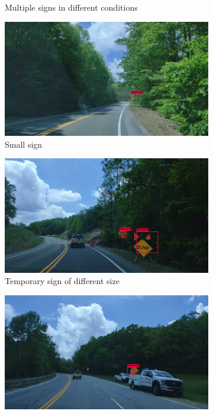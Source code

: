 \begin{figure}
\begin{center}
\begin{subfigure}[t]{.49\linewidth}
      \caption{Multiple signs in different conditions}
      \label{fig:multipleTP}
    \end{subfigure}
    \begin{subfigure}[t]{.49\linewidth}
      \centering
      \includegraphics[width=0.99\linewidth]{figures/examples/sr2/TP/TP_08.png}
      \caption{Small sign}
      \label{fig:smallTP}
    \end{subfigure}
    \begin{subfigure}[t]{.49\linewidth}
      \centering
      \includegraphics[width=0.99\linewidth]{figures/examples/sr2/TP/TP_02.png}
      \caption{Temporary sign of different size}
      \label{fig:bigtempTP}
    \end{subfigure}
    \begin{subfigure}[t]{.49\linewidth}
      \centering
      \includegraphics[width=0.99\linewidth]{figures/examples/sr2/TP/TP_04.png}

\end{subfigure}
\end{center}
\end{figure}
